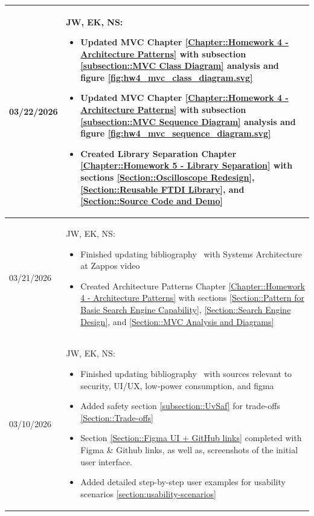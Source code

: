 \begin{longtable}{|l||p{13.5cm}|}
03/22/2026 & 
JW, EK, NS:
\begin{itemize}[topsep=0pt,itemsep=0pt,parsep=0pt,partopsep=0pt,leftmargin=12pt]
\item Updated MVC Chapter \ref{Chapter::Homework 4 - Architecture Patterns} with subsection \ref{subsection::MVC Class Diagram} analysis and figure \ref{fig:hw4_mvc_class_diagram.svg}
\item Updated MVC Chapter \ref{Chapter::Homework 4 - Architecture Patterns} with subsection \ref{subsection::MVC Sequence Diagram} analysis and figure \ref{fig:hw4_mvc_sequence_diagram.svg}
\item Created Library Separation Chapter \ref{Chapter::Homework 5 - Library Separation} with sections \ref{Section::Oscilloscope Redesign}, \ref{Section::Reusable FTDI Library}, and \ref{Section::Source Code and Demo}
\end{itemize}
\\ \hline

03/21/2026 & 
JW, EK, NS:
\begin{itemize}[topsep=0pt,itemsep=0pt,parsep=0pt,partopsep=0pt,leftmargin=12pt]
\item Finished updating bibliography~\pageref{chap:bibliography} with Systems Architecture at Zappos video
\item Created Architecture Patterns Chapter \ref{Chapter::Homework 4 - Architecture Patterns} with sections \ref{Section::Pattern for Basic Search Engine Capability}, \ref{Section::Search Engine Design}, and \ref{Section::MVC Analysis and Diagrams}

\end{itemize}
\\ \hline

03/10/2026 & 
JW, EK, NS:
\begin{itemize}[topsep=0pt,itemsep=0pt,parsep=0pt,partopsep=0pt,leftmargin=12pt]
\item Finished updating bibliography~\pageref{chap:bibliography} with sources relevant to security, UI/UX, low-power consumption, and figma
\item Added safety section \ref{subsection::UvSaf} for trade-offs \ref{Section::Trade-offs} 
\item Section \ref{Section::Figma UI + GitHub links} completed with Figma \& Github links, as well as, screenshots of the initial user interface.
\item Added detailed step-by-step user examples for usability scenarios \ref{section:usability-scenarios}
\end{itemize}
\\ \hline


\end{longtable}
